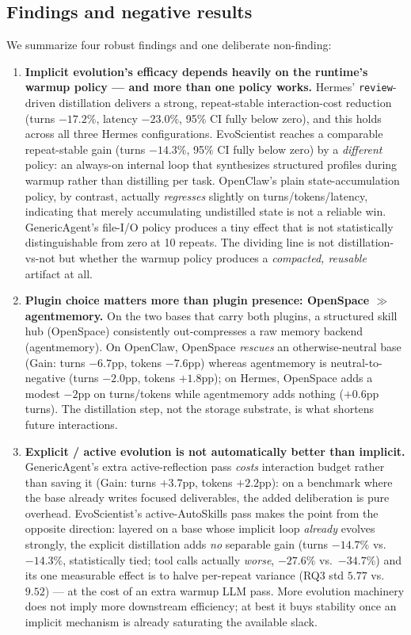 \documentclass{article}
\begin{document}
\subsection{Findings and negative results}
\label{sec:findings}

We summarize four robust findings and one deliberate non-finding:
\begin{enumerate}
\item \textbf{Implicit evolution's efficacy depends heavily on the runtime's warmup policy --- and more than one policy works.} Hermes' \texttt{review}-driven distillation delivers a strong, repeat-stable interaction-cost reduction (turns $-17.2\%$, latency $-23.0\%$, 95\% CI fully below zero), and this holds across all three Hermes configurations. EvoScientist reaches a comparable repeat-stable gain (turns $-14.3\%$, 95\% CI fully below zero) by a \emph{different} policy: an always-on internal loop that synthesizes structured profiles during warmup rather than distilling per task. OpenClaw's plain state-accumulation policy, by contrast, actually \emph{regresses} slightly on turns/tokens/latency, indicating that merely accumulating undistilled state is not a reliable win. GenericAgent's file-I/O policy produces a tiny effect that is not statistically distinguishable from zero at 10 repeats. The dividing line is not distillation-vs-not but whether the warmup policy produces a \emph{compacted, reusable} artifact at all.
\item \textbf{Plugin choice matters more than plugin presence: OpenSpace $\gg$ agentmemory.} On the two bases that carry both plugins, a structured skill hub (OpenSpace) consistently out-compresses a raw memory backend (agentmemory). On OpenClaw, OpenSpace \emph{rescues} an otherwise-neutral base (Gain: turns $-6.7$pp, tokens $-7.6$pp) whereas agentmemory is neutral-to-negative (turns $-2.0$pp, tokens $+1.8$pp); on Hermes, OpenSpace adds a modest $-2$pp on turns/tokens while agentmemory adds nothing ($+0.6$pp turns). The distillation step, not the storage substrate, is what shortens future interactions.
\item \textbf{Explicit / active evolution is not automatically better than implicit.} GenericAgent's extra active-reflection pass \emph{costs} interaction budget rather than saving it (Gain: turns $+3.7$pp, tokens $+2.2$pp): on a benchmark where the base already writes focused deliverables, the added deliberation is pure overhead. EvoScientist's active-AutoSkills pass makes the point from the opposite direction: layered on a base whose implicit loop \emph{already} evolves strongly, the explicit distillation adds \emph{no} separable gain (turns $-14.7\%$ vs.\ $-14.3\%$, statistically tied; tool calls actually \emph{worse}, $-27.6\%$ vs.\ $-34.7\%$) and its one measurable effect is to halve per-repeat variance (RQ3 std $5.77$ vs.\ $9.52$) --- at the cost of an extra warmup LLM pass. More evolution machinery does not imply more downstream efficiency; at best it buys stability once an implicit mechanism is already saturating the available slack.

\end{enumerate}
\end{document}
